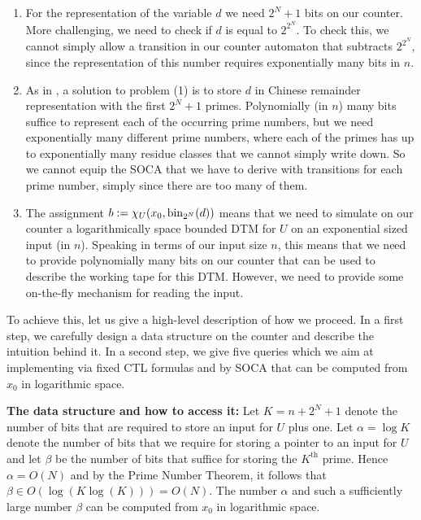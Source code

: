 \documentclass[times,envcountsame]{llncs}
\begin{document}
\begin{enumerate}[(1)]
\item For the representation of the variable $d$ we need $2^N+1$ bits
  on our counter. More challenging, we need to check if $d$ is
  equal to $2^{2^N}$. To check this, we cannot simply allow a
  transition in our counter automaton that subtracts $2^{2^N}$,
  since the representation of this number requires exponentially many
  bits in $n$.
\item As in \cite{GoLo10}, a solution to problem (1) is to store $d$
  in Chinese remainder representation with the first $2^N+1$ primes.
  Polynomially (in $n$) many bits suffice to represent each of the
  occurring prime numbers, but we need exponentially many different
  prime numbers, where each of the primes has up to exponentially many
  residue classes that we cannot simply write down. So we cannot equip
  the SOCA that we have to derive with transitions for each prime
  number, simply since there are too many of them.

\item The assignment $b:=\chi_U(x_0,\text{bin}_{2^N}(d))$ means that we need to simulate on
our counter a logarithmically space bounded DTM for $U$ on an exponential
sized input (in $n$).
Speaking in terms of our input size $n$, this means that we need to provide
polynomially many bits on our counter that can be used to describe the
working tape for this DTM. However, we need to provide
some on-the-fly mechanism for reading the input.
\end{enumerate}

\fi
\noindent
To achieve this, let us give a high-level description of how we proceed.
In a first step, we carefully design a data structure on the counter
and describe the intuition behind it.
In a second step, we give five queries which we aim at implementing
via fixed CTL formulas and by SOCA that can be computed from $x_0$
in logarithmic space.

\bigskip

\noindent
{\bf The data structure and how to access it: }
Let $K=n+2^N+1$ denote the number of bits that are required to store an input
for $U$ plus one.
Let $\alpha=\log K$ denote the number of bits that we require for
storing a pointer to an input for $U$ and let $\beta$
be the number of bits that suffice for storing the
$K^{\text{th}}$ prime. Hence $\alpha=O(N)$ and by
the Prime Number Theorem, it follows that
$\beta\in O(\log(K\log(K)))=O(N)$.
The number $\alpha$ and such a sufficiently large number $\beta$ can be computed
 from $x_0$ in logarithmic space.
\end{document}
